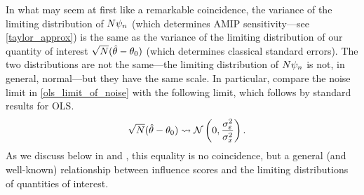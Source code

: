 %
In what may seem at first like a remarkable coincidence, the variance of the
limiting distribution of $N \psi_n$ (which determines AMIP sensitivity---see
\eqref{taylor_approx}) is the same as the variance of the limiting distribution
of our quantity of interest $\sqrt{N}(\hat{\theta} - \theta_0)$ (which determines
classical standard errors). The two distributions are not the same---the
limiting distribution of $N \psi_n$ is not, in general, normal---but they
have the same scale.  In particular, compare the noise limit in
\eqref{ols_limit_of_noise} with the following limit, which follows by standard
results for OLS.
%
\begin{align*}
%
\quad
\sqrt{N}(\thetahat - \theta_0) \dlim
\mathcal{N}\left(0, \frac{\sigma_\varepsilon^2}{\sigma_x^2} \right).
%
\end{align*}
%
As we discuss below in 
and , this equality is no
coincidence, but a general (and well-known) relationship between influence
scores and the limiting distributions of quantities of interest.

